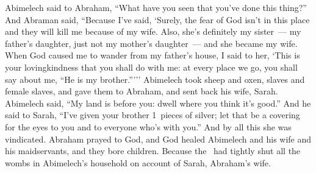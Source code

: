 \begin{inparaenum}
   Abimelech said to Abraham, ``What have you seen that you've done this thing?''%
   And Abraman said, ``Because I've said, `Surely, the fear of God isn't in this place and they will kill me because of my wife.%
   Also, she's definitely my sister~--- my father's daughter, just not my mother's daughter~--- and she became my wife.%
   When God caused me to wander from my father's house, I said to her, `This is your lovingkindness that you shall do with me: at every place we go, you shall say about me, ``He is my brother.''\thinspace'\thinspace''%
   Abimelech took sheep and oxen, slaves and female slaves, and gave them to Abraham, and sent back his wife, Sarah.%
   Abimelech said, ``My land is before you: dwell where you think it's good.''%
   And he said to Sarah, ``I've given your brother 1~pieces of silver; let that be a covering for the eyes to you and to everyone who's with you.'' And by all this she was vindicated.%
   Abraham prayed to God, and God healed Abimelech and his wife and his maidservants, and they bore children.\understood{}%
   Because the \lord\ had tightly shut all the wombs in Abimelech's household on account of Sarah, Abraham's wife.%
\end{inparaenum}
